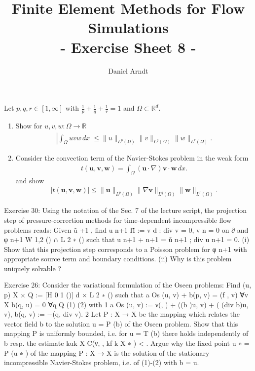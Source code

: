 \documentclass[12pt]{article}
\newcommand{\bu}{\boldsymbol{u}}
\newcommand{\bv}{\boldsymbol{v}}
\newcommand{\bw}{\boldsymbol{w}}
\newenvironment{exercise}[2][Exercise]{\begin{trivlist}
\item[\hskip \labelsep {\bfseries #1}\hskip \labelsep {\bfseries #2.}]}{\end{trivlist}}
\begin{document}
 
\title{Finite Element Methods for Flow Simulations\\ - Exercise Sheet 8 -}
\author{Daniel Arndt}
\date{}
\maketitle

\begin{exercise}{14}
Let $p, q, r \in [1, \infty]$ with $\frac{1}{p}+\frac{1}{q}+\frac{1}{r}=1$ and $\Omega\subset\mathbb{R}^d$.
\begin{enumerate}
\item Show for $u,v,w\colon\Omega\to\mathbb{R}$
\begin{align*}
\left|\int_\Omega u v w \, dx\right|\leq \|u\|_{L^p(\Omega)}\|v\|_{L^q(\Omega)}\|w\|_{L^r(\Omega)}.
\end{align*}

\item Consider the convection term of the Navier-Stokes problem in the weak form
\begin{align*}
t(\bu, \bv, \bw) = \int_\Omega (\bu \cdot \nabla)\bv \cdot \bw \,dx.
\end{align*}
and show
\begin{align*}
|t(\bu, \bv, \bw)| \leq \|\bu\|_{L^p(\Omega)}\|\nabla \bv\|_{L^q(\Omega)} \|\bw\|_{L^r(\Omega)}.
\end{align*}
\end{enumerate}
\end{exercise}

\begin{exercise}{15}
Exercise 30:
Using the notation of the Sec. 7 of the lecture script, the projection step of pressure-correction methods
for time-dependent incompressible flow problems reads:
Given ũ +1 , find u n+1 \in H̃ := {v \in [L 2 (\Omega)] d : div v = 0, v \cdot n = 0 on ∂\Omega} and φ n+1 \in W 1,2 (\Omega) ∩ L 2 ∗ (\Omega)
such that
u n+1 +  n+1 = ũ n+1 ;
div u n+1 = 0.
(i) Show that this projection step corresponds to a Poisson problem for φ n+1 with appropriate source
term and boundary conditions.
(ii) Why is this problem uniquely solvable ?
\end{exercise}

\begin{exercise}{16}
Exercise 26:
Consider the variational formulation of the Oseen problems: Find (u, p) \in X × Q := [H 0 1 (\Omega)] d × L 2 ∗ (\Omega)
such that
a Os (u, v) + b(p, v) = (f , v) ∀v \in X
b(q, u) = 0
∀q \in Q
(1)
(2)
with
1
a Os (u, v) := ν(\nablau, \nablav) + ((b \cdot \nabla)u, v) + ( (div b)u, v),
b(q, v) := −(q, div v).
2
Let P : X → X be the mapping which relates the vector field b to the solution u = P (b) of the Oseen
problem. Show that this mapping P is uniformly bounded, i.e. for u = T (b) there holds independently
of b resp. \nablab the estimate
kuk X \leq C(ν, \Omega, kf k X ∗ ) < \infty.
Argue why the fixed point u ∗ = P (u ∗ ) of the mapping P : X → X is the solution of the stationary
incompressible Navier-Stokes problem, i.e. of (1)-(2) with b = u.
\end{exercise}
\end{document}
